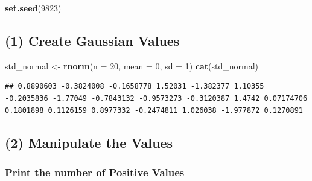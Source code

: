 \documentclass[]{article}
\newenvironment{Shaded}{}{}
\newcommand{\DataTypeTok}[1]{\textcolor[rgb]{0.56,0.13,0.00}{#1}}
\newcommand{\DecValTok}[1]{\textcolor[rgb]{0.25,0.63,0.44}{#1}}
\newcommand{\KeywordTok}[1]{\textcolor[rgb]{0.00,0.44,0.13}{\textbf{#1}}}
\newcommand{\NormalTok}[1]{#1}
\newcommand{\OperatorTok}[1]{\textcolor[rgb]{0.40,0.40,0.40}{#1}}
\newcommand{\StringTok}[1]{\textcolor[rgb]{0.25,0.44,0.63}{#1}}
\begin{document}
\newpage{}

\begin{Shaded}
\begin{Highlighting}[]
\KeywordTok{set.seed}\NormalTok{(}\DecValTok{9823}\NormalTok{)}
\end{Highlighting}
\end{Shaded}

\begin{Shaded}
\end{Shaded}

\hypertarget{create-gaussian-values}{%
\subsection{(1) Create Gaussian Values}\label{create-gaussian-values}}

\begin{Shaded}
\begin{Highlighting}[]
\NormalTok{std_normal <-}\StringTok{ }\KeywordTok{rnorm}\NormalTok{(}\DataTypeTok{n =} \DecValTok{20}\NormalTok{, }\DataTypeTok{mean =} \DecValTok{0}\NormalTok{, }\DataTypeTok{sd =} \DecValTok{1}\NormalTok{)}
\KeywordTok{cat}\NormalTok{(std_normal)}
\end{Highlighting}
\end{Shaded}

\begin{verbatim}
## 0.8890603 -0.3824008 -0.1658778 1.52031 -1.382377 1.10355 -0.2035836 -1.77049 -0.7843132 -0.9573273 -0.3120387 1.4742 0.07174706 0.1801898 0.1126159 0.8977332 -0.2474811 1.026038 -1.977872 0.1270891
\end{verbatim}

\hypertarget{manipulate-the-values}{%
\subsection{(2) Manipulate the Values}\label{manipulate-the-values}}

\hypertarget{print-the-number-of-positive-values}{%
\subsubsection{Print the number of Positive
Values}\label{print-the-number-of-positive-values}}
\end{document}
